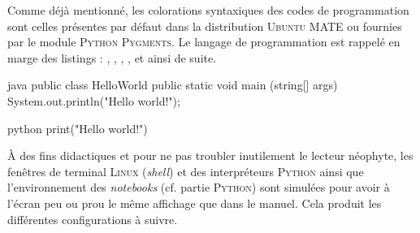 Comme déjà mentionné, les colorations syntaxiques des codes de programmation sont celles présentes par défaut dans la distribution \textsc{Ubuntu} MATE ou fournies par le module \textsc{Python} \textsc{Pygments}. Le langage de programmation est rappelé en marge des listings : \textcolor{firstcolor}{\xfaC}, \textcolor{firstcolor}{\xfaCplusplus}, \textcolor{firstcolor}{\xfaJavaBold}, \textcolor{firstcolor}{\faJs}, \textcolor{firstcolor}{\xfaPython} et ainsi de suite.

\begin{fullwidth}
\hfill
\begin{codebox}[width=0.45\linewidth, nobeforeafter]{java}
public class HelloWorld
{
	public static void main (string[] args)
	{
		System.out.println("Hello world!");
	}
}
\end{codebox}
\qquad\quad %
\begin{codebox}[width=0.265\linewidth, nobeforeafter]{python}
print("Hello world!")
\end{codebox}
\end{fullwidth}

À des fins didactiques et pour ne pas troubler inutilement le lecteur néophyte, les fenêtres de terminal \textsc{Linux} (\textit{shell}) et des interpréteurs \textsc{Python} ainsi que l'environnement des \textit{notebooks} (cf. partie \textsc{Python}) sont simulées pour avoir à l'écran peu ou prou le même affichage que dans le manuel. Cela produit les différentes configurations à suivre.

